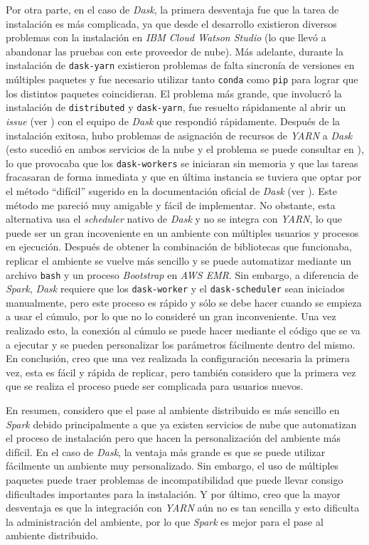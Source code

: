 Por otra parte, en el caso de \textit{Dask}, la primera desventaja fue que la tarea de instalación es más complicada, ya que desde el desarrollo existieron diversos problemas con la instalación en \textit{IBM Cloud Watson Studio} (lo que llevó a abandonar las pruebas con este proveedor de nube). Más adelante, durante la instalación de \texttt{dask-yarn} existieron problemas de falta sincronía de versiones en múltiples paquetes y fue necesario utilizar tanto \texttt{conda} como \texttt{pip} para lograr que los distintos paquetes coincidieran. El problema más grande, que involucró la instalación de \texttt{distributed} y \texttt{dask-yarn}, fue resuelto rápidamente al abrir un \textit{issue} (ver \cite{issue-dask-yarn}) con el equipo de \textit{Dask} que respondió rápidamente. Después de la instalación exitosa, hubo problemas de asignación de recursos de \textit{YARN} a \textit{Dask} (esto sucedió en ambos servicios de la nube y el problema se puede consultar en \cite{q-dask-yarn}), lo que provocaba que los \texttt{dask-workers} se iniciaran sin memoria y que las tareas fracasaran de forma inmediata y que en última instancia se tuviera que optar por el método ``difícil'' sugerido en la documentación oficial de \textit{Dask} (ver \cite{daskdistributedsetup}). Este método me pareció muy amigable y fácil de implementar. No obstante, esta alternativa usa el \textit{scheduler} nativo de \textit{Dask} y no se integra con \textit{YARN}, lo que puede ser un gran incoveniente en un ambiente con múltiples usuarios y procesos en ejecución. Después de obtener la combinación de bibliotecas que funcionaba, replicar el ambiente se vuelve más sencillo y se puede automatizar mediante un archivo \texttt{bash} y un proceso \textit{Bootstrap} en \textit{AWS EMR}. Sin embargo, a diferencia de \textit{Spark}, \textit{Dask} requiere que los \texttt{dask-worker} y el \texttt{dask-scheduler} sean iniciados manualmente, pero este proceso es rápido y sólo se debe hacer cuando se empieza a usar el cúmulo, por lo que no lo consideré un gran inconveniente. Una vez realizado esto, la conexión al cúmulo se puede hacer mediante el código que se va a ejecutar y se pueden personalizar los parámetros fácilmente dentro del mismo. En conclusión, creo que una vez realizada la configuración necesaria la primera vez, esta es fácil y rápida de replicar, pero también considero que la primera vez que se realiza el proceso puede ser complicada para usuarios nuevos. 

En resumen, considero que el pase al ambiente distribuido es más sencillo en \textit{Spark} debido principalmente a que ya existen servicios de nube que automatizan el proceso de instalación pero que hacen la personalización del ambiente más difícil. En el caso de \textit{Dask}, la ventaja más grande es que se puede utilizar fácilmente un ambiente muy personalizado. Sin embargo, el uso de múltiples paquetes puede traer problemas de incompatibilidad que puede llevar consigo dificultades importantes para la instalación. Y por último, creo que la mayor desventaja es que la integración con \textit{YARN} aún no es tan sencilla y esto dificulta la administración del ambiente, por lo que \textit{Spark} es mejor para el pase al ambiente distribuido. 
